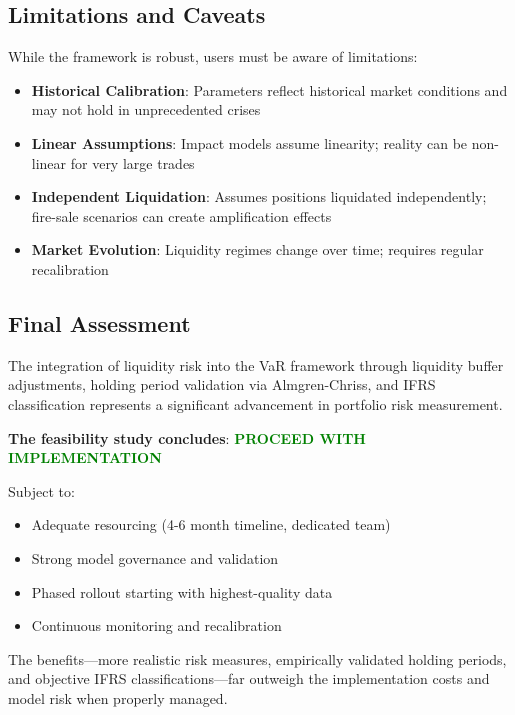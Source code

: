 \documentclass[11pt,a4paper]{article}
\begin{document}
\subsection{Limitations and Caveats}

While the framework is robust, users must be aware of limitations:

\begin{itemize}
    \item \textbf{Historical Calibration}: Parameters reflect historical market conditions and may not hold in unprecedented crises

    \item \textbf{Linear Assumptions}: Impact models assume linearity; reality can be non-linear for very large trades

    \item \textbf{Independent Liquidation}: Assumes positions liquidated independently; fire-sale scenarios can create amplification effects

    \item \textbf{Market Evolution}: Liquidity regimes change over time; requires regular recalibration
\end{itemize}

\subsection{Final Assessment}

The integration of liquidity risk into the VaR framework through liquidity buffer adjustments, holding period validation via Almgren-Chriss, and IFRS classification represents a significant advancement in portfolio risk measurement.

\textbf{The feasibility study concludes}: \textcolor{green}{\textbf{PROCEED WITH IMPLEMENTATION}}

Subject to:
\begin{itemize}
    \item Adequate resourcing (4-6 month timeline, dedicated team)
    \item Strong model governance and validation
    \item Phased rollout starting with highest-quality data
    \item Continuous monitoring and recalibration
\end{itemize}

The benefits—more realistic risk measures, empirically validated holding periods, and objective IFRS classifications—far outweigh the implementation costs and model risk when properly managed.
\end{document}
